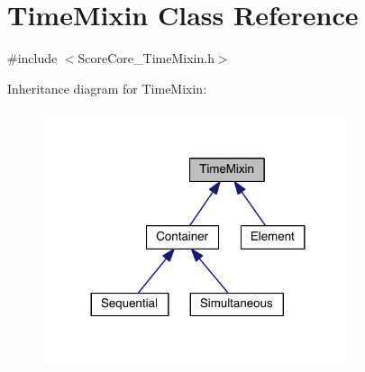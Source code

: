 \hypertarget{class_time_mixin}{\section{Time\-Mixin Class Reference}
\label{class_time_mixin}
}


{\ttfamily \#include $<$Score\-Core\-\_\-\-Time\-Mixin.\-h$>$}



Inheritance diagram for Time\-Mixin\-:\nopagebreak
\begin{figure}[H]
\begin{center}
\leavevmode
\includegraphics[width=257pt]{class_time_mixin__inherit__graph}
\end{center}
\end{figure}
